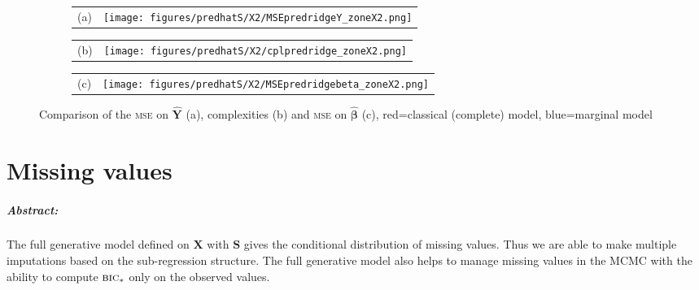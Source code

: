 \documentclass[12pt,a4paper]{report}
\begin{document}
\begin{figure}[h!]
\centering
\begin{subfigure}
	\centering
	\begin{tabular}[c]{m{5px} m{450px}}
	\setcellgapes{0pt}
	(a) & \texttt{[image: figures/predhatS/X2/MSEpredridgeY\_zoneX2.png]}
\end{tabular}		
	\end{subfigure}
	\begin{subfigure}
	\centering
	\begin{tabular}[c]{m{5px} m{450px}}
	(b) &  \texttt{[image: figures/predhatS/X2/cplpredridge\_zoneX2.png]}
		\end{tabular}
	\end{subfigure}
	\begin{subfigure}
	\centering
		 \begin{tabular}[c]{m{5px} m{450px}}
	(c) &  \texttt{[image: figures/predhatS/X2/MSEpredridgebeta\_zoneX2.png]}
		\end{tabular}
	\end{subfigure}
	\caption{Comparison of the \textsc{mse} on $\hat{\boldsymbol{Y}}$ (a), complexities (b) and \textsc{mse} on $\hat{\boldsymbol{\beta}}$ (c), red=classical (complete) model, blue=marginal model}\label{MSEpredridgeX2}
\end{figure}
	\FloatBarrier
\newpage
	\setcellgapes{1pt}
	
\chapter{Missing values} \label{chapmiss}
	\paragraph{Abstract:} The full generative model defined on $\boldsymbol{X}$ with $\boldsymbol{S}$ gives the conditional distribution of missing values. Thus we are able to make multiple imputations based on the sub-regression structure. The full generative model also helps to manage missing values in the MCMC with the ability to compute $\mbox{{\sc bic}}_*$ only on the observed values. 
	
\end{document}
